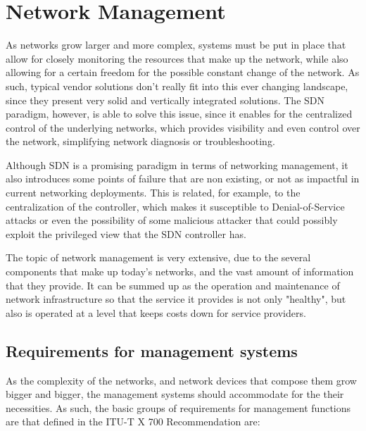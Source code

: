\section{Network Management} \label{chap:nm} 

\par As networks grow larger and more complex, systems must be put in place that allow for closely monitoring the resources that make up the network, while also 
allowing for a certain freedom for the possible constant change of the network. As such, typical vendor solutions don't really fit into this ever changing landscape,
since they present very solid and vertically integrated solutions. The SDN paradigm, however, is able to solve this issue, since it enables for the centralized
control of the underlying networks, which provides visibility and even control over the network, simplifying network diagnosis or troubleshooting. 

\par Although SDN is a promising paradigm in terms of networking management, it also introduces some points of failure that are non existing, or not as impactful in
current networking deployments. This is related, for example, to the centralization of the controller, which makes it susceptible to Denial-of-Service attacks or
even the possibility of some malicious attacker that could possibly exploit the privileged view that the SDN controller has.
\par The topic of network management is very extensive, due to the several components that make up today's networks, and the vast amount of information that they
provide. It can be summed up as the operation and maintenance of network infrastructure so that the service it provides is not only "healthy", but also is operated
at a level that keeps costs down for service providers. 

\subsection {Requirements for management systems}

\par As the complexity of the networks, and network devices that compose them grow bigger and bigger, the management systems should accommodate for the their
necessities. As such, the basic groups of requirements for management functions are that defined in the ITU-T X 700 Recommendation \cite{noauthor_recommendation_1992}
are:

